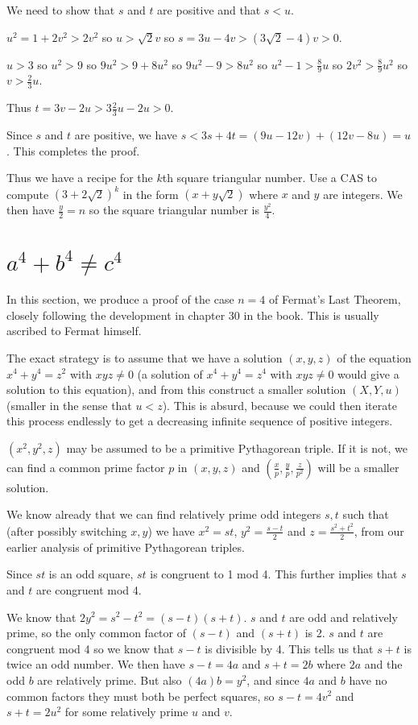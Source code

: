 \documentclass[12pt]{article}
\begin{document}
We need to show that $s$ and $t$ are positive and that $s<u$.

$u^2=1+2v^2>2v^2$ so $u>\sqrt2v$ so $s=3u-4v>(3\sqrt2 -4)v>0$.

$u>3$ so $u^2>9$ so $9u^2>9+8u^2$ so $9u^2-9>8u^2$ so $u^2-1>\frac89u$ so $2v^2>\frac89u^2$ so $v>\frac23u$.

Thus $t=3v-2u>3\frac23u-2u>0$.

Since $s$ and $t$ are positive, we have $s<3s+4t=(9u-12v)+(12v-8u)=u$.  This completes the proof.

Thus we have a recipe for the $k$th square triangular number.   Use a CAS to compute $(3+2\sqrt2)^k$ in the form
$(x+y\sqrt2)$ where $x$ and $y$ are integers.  We then have $\frac y2= n$ so the square triangular number is
$\frac {y^2}4$.

\newpage

\section{$a^4+b^4 \neq c^4$}

In this section, we produce a proof of the case $n=4$ of Fermat's Last Theorem, closely following the development in chapter 30 in the book.   This is usually ascribed to Fermat himself. 

The exact strategy is to assume that we have a solution $(x,y,z)$ of the equation $x^4+y^4=z^2$ with $xyz \neq 0$
(a solution of $x^4+y^4=z^4$ with $xyz \neq 0$ would give a solution to this equation), and from this construct a smaller solution
$(X,Y,u)$ (smaller in the sense that $u<z$).   This is absurd, because we could then iterate this process endlessly to get a decreasing infinite sequence of positive integers.

$(x^2,y^2,z)$ may be assumed to be a primitive Pythagorean triple.   If it is not, we can find a common prime factor $p$ in
$(x,y,z)$ and $(\frac xp,\frac yp, \frac z{p^2})$ will be a smaller solution.

We know already that we can find relatively prime odd integers $s,t$ such that (after possibly switching $x,y$) we have $x^2=st$, $y^2=\frac{s-t}2$
and $z=\frac{s^2+t^2}2$, from our earlier analysis of primitive Pythagorean triples.

Since $st$ is an odd square, $st$ is congruent to 1 mod 4.  This further implies that $s$ and $t$ are congruent mod 4.

We know that $2y^2=s^2-t^2=(s-t)(s+t)$.  $s$ and $t$ are odd and relatively prime, so the only common factor of $(s-t)$ and $(s+t)$
is 2.  $s$ and $t$ are congruent mod 4 so we know that $s-t$ is divisible by 4.  This tells us that $s+t$ is twice an odd number.  We then
have $s-t=4a$ and $s+t=2b$ where $2a$ and the odd $b$ are relatively prime.  But also $(4a)b=y^2$, and since $4a$ and $b$ have no common factors they must both be perfect squares, so $s-t=4v^2$ and $s+t=2u^2$ for some relatively prime $u$ and $v$.
\end{document}
